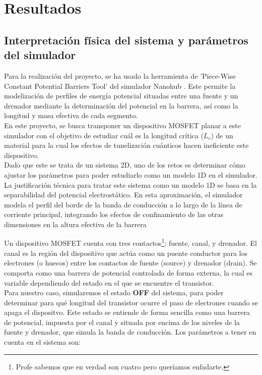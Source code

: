 
\section{Resultados}

\subsection{Interpretación física del sistema y parámetros del simulador}

Para la realización del proyecto, se ha usado la herramienta de 'Piece-Wise Constant Potential Barriers Tool' del simulador Nanohub \cite{nanohub_pcpbt}. Este permite la modelización de perfiles de energía potencial situadas entre una fuente y un drenador mediante la determinación del potencial en la barrera, así como la longitud y masa efectiva de cada segmento. \\

En este proyecto, se busca transponer un dispositivo MOSFET planar a este simulador con el objetivo de estudiar cuál es la longitud crítica ($L_c$) de un material para la cual los efectos de tunelización cuánticos hacen ineficiente este dispositivo. \\
Dado que este se trata de un sistema 2D, uno de los retos es determinar cómo ajustar los parámetros para poder estudiarlo como un modelo 1D en el simulador. \\
La justificación técnica para tratar este sistema como un modelo 1D se basa en la separabilidad del potencial electrostático. En esta aproximación, el simulador modela el perfil del borde de la banda de conducción a lo largo de la línea de corriente principal, integrando los efectos de confinamiento de las otras dimensiones en la altura efectiva de la barrera

Un dispositivo MOSFET cuenta con tres contactos\footnote{Profe sabemos que en verdad son cuatro pero queríamos enfadarte.}: fuente, canal, y drenador. El canal es la región del dispositivo que actúa como un puente conductor para los electrones (o huecos) entre los contactos de fuente (source) y drenador (drain). Se comporta como una barrera de potencial controlada de forma externa, la cual es variable dependiendo del estado en el que se encuentre el transistor. \\

Para nuestro caso, simularemos el estado \textbf{OFF} del sistema, para poder determinar para qué longitud del transistor ocurre el paso de electrones cuando se apaga el dispositvo. Este estado se entiende de forma sencilla como una barrera de potencial, impuesta por el canal y situada por encima de los niveles de la fuente y drenador, que simula la banda de conducción. Los parámetros a tener en cuenta en el sistema son: 

